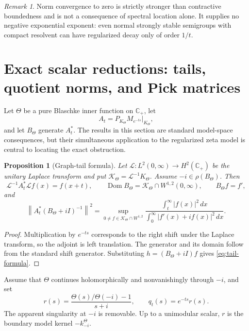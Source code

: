 \documentclass[11pt]{amsart}
\newtheorem{proposition}[theorem]{Proposition}
\theoremstyle{definition}
\theoremstyle{remark}
\newtheorem{remark}[theorem]{Remark}
\DeclareMathOperator{\Dom}{Dom}
\newcommand{\C}{\mathbb C}
\newcommand{\norm}[1]{\left\lVert #1\right\rVert}
\newcommand{\abs}[1]{\left\lvert #1\right\rvert}
\begin{document}
\begin{remark}
Norm convergence to zero is strictly stronger than contractive boundedness
and is not a consequence of spectral location alone.  It supplies no
negative exponential exponent: even normal strongly stable semigroups with
compact resolvent can have regularized decay only of order $1/t$.
\end{remark}

\section{Exact scalar reductions: tails, quotient norms, and Pick matrices}
\label{sec:exact-reductions}

Let $\Theta$ be a pure Blaschke inner function on $\C_+$, let
\[
 A_t=P_{K_\Theta}M_{e^{-ts}}\big|_{K_\Theta},
\]
and let $B_\Theta$ generate $A_t^*$.  The results in this section are standard
model-space consequences, but their simultaneous application to the
regularized zeta model is central to locating the exact obstruction.

\begin{proposition}[Graph-tail formula]
\label{prop:tail-formula}
Let $\mathcal L:L^2(0,\infty)\to H^2(\C_+)$ be the unitary Laplace transform
and put $\mathscr K_\Theta=\mathcal L^{-1}K_\Theta$.  Assume
$-i\in\rho(B_\Theta)$.  Then
\[
 \mathcal L^{-1}A_t^*\mathcal L f(x)=f(x+t),
 \qquad
 \Dom B_\Theta=\mathscr K_\Theta\cap W^{1,2}(0,\infty),
 \qquad B_\Theta f=f',
\]
and
\begin{equation}\label{eq:tail-formula}
 \norm{A_t^*(B_\Theta+iI)^{-1}}^2
 =
 \sup_{0\neq f\in\mathscr K_\Theta\cap W^{1,2}}
 \frac{\displaystyle\int_t^\infty\abs{f(x)}^2\,dx}
 {\displaystyle\int_0^\infty\abs{f'(x)+if(x)}^2\,dx}.
\end{equation}
\end{proposition}

\begin{proof}
Multiplication by $e^{-ts}$ corresponds to the right shift under the Laplace
transform, so the adjoint is left translation.  The generator and its domain
follow from the standard shift generator.  Substituting
$h=(B_\Theta+iI)f$ gives \eqref{eq:tail-formula}.
\end{proof}

Assume that $\Theta$ continues holomorphically and nonvanishingly through
$-i$, and set
\begin{equation}\label{eq:r-symbol}
 r(s)=\frac{\Theta(s)/\Theta(-i)-1}{s+i},
 \qquad q_t(s)=e^{-ts}r(s).
\end{equation}
The apparent singularity at $-i$ is removable.  Up to a unimodular scalar,
$r$ is the boundary model kernel $-k_{-i}^{\Theta}$.
\end{document}
